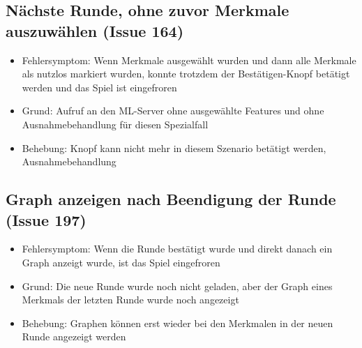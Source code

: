\documentclass[a4paper]{scrreprt}
\begin{document}
    \subsection{Nächste Runde, ohne zuvor Merkmale auszuwählen (Issue 164)}
    \begin{itemize}
    \item Fehlersymptom: Wenn Merkmale ausgewählt wurden und dann alle Merkmale
     als nutzlos markiert wurden, konnte trotzdem der Bestätigen-Knopf betätigt
     werden und das Spiel ist eingefroren
    \item Grund: Aufruf an den ML-Server ohne ausgewählte Features und ohne
     Ausnahmebehandlung für diesen Spezialfall
    \item Behebung: Knopf kann nicht mehr in diesem Szenario betätigt werden, Ausnahmebehandlung
    \end{itemize}

    \subsection{Graph anzeigen nach Beendigung der Runde (Issue 197)}
    \begin{itemize}
        \item Fehlersymptom: Wenn die Runde bestätigt wurde und direkt danach ein Graph anzeigt wurde, ist das Spiel eingefroren
        \item Grund: Die neue Runde wurde noch nicht geladen, aber der Graph eines Merkmals der letzten Runde wurde noch angezeigt
        \item Behebung: Graphen können erst wieder bei den Merkmalen in der neuen Runde angezeigt werden
    \end{itemize}
\end{document}
